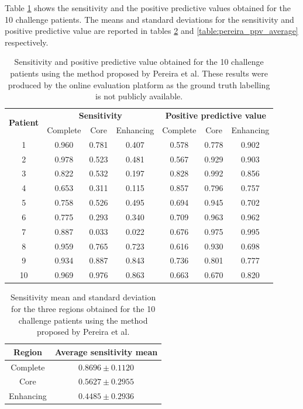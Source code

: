 \documentclass[12pt,a4paper,twoside,openright]{report}
\begin{document}
Table \ref{table:pereira_other_results} shows the sensitivity and the positive predictive values obtained for the 10 challenge patients. The means and standard deviations for the sensitivity and positive predictive value are reported in tables \ref{table:pereira_sensitivity_average} and \ref{table:pereira_ppv_average} respectively.
\begin{table}[h]
\centering	
\label{table:pereira_other_results}
\begin{tabular}{ c | c c c | c c c} 
\multirow{2}{*}{\textbf{Patient}} & \multicolumn{3}{c|}{\textbf{Sensitivity}} & \multicolumn{3}{c}{\textbf{Positive predictive value}}\\
 & Complete & Core & Enhancing & Complete & Core & Enhancing \\
\hline
1 & 0.960 &	0.781 & 0.407 & 0.578 & 0.778 & 0.902 \\
2 & 0.978 & 0.523 & 0.481 & 0.567 & 0.929 & 0.903 \\
3 & 0.822 & 0.532 & 0.197 &	0.828 & 0.992 & 0.856 \\
4 & 0.653 & 0.311 & 0.115 & 0.857 & 0.796 & 0.757 \\ 
5 & 0.758 & 0.526 & 0.495 & 0.694 & 0.945 & 0.702 \\
6 & 0.775 & 0.293 & 0.340 & 0.709 & 0.963 & 0.962 \\
7 & 0.887 & 0.033 & 0.022 & 0.676 & 0.975 & 0.995 \\
8 & 0.959 & 0.765 & 0.723 & 0.616 & 0.930 & 0.698 \\
9 & 0.934 & 0.887 & 0.843 & 0.736 & 0.801 & 0.777 \\
10 & 0.969 & 0.976 & 0.863 & 0.663 & 0.670 & 0.820 \\
\end{tabular}
\caption{Sensitivity and positive predictive value obtained for the 10 challenge patients using the method proposed by Pereira et al. These results were produced by the online evaluation platform as the ground truth labelling is not publicly available.}
\end{table}

\begin{table}[h]
\centering	
\label{table:pereira_sensitivity_average}
\begin{tabular}{ c | c } 
\textbf{Region} & \textbf{Average sensitivity mean} \\
 \hline
Complete &	$0.8696 \pm 0.1120$ \\
Core & 		$0.5627 \pm 0.2955$ \\
Enhancing & $0.4485  \pm 0.2936$ \\
\end{tabular}
\caption{Sensitivity mean and standard deviation for the three regions obtained for the 10 challenge patients using the method proposed by Pereira et al.}
\end{table}
\end{document}
